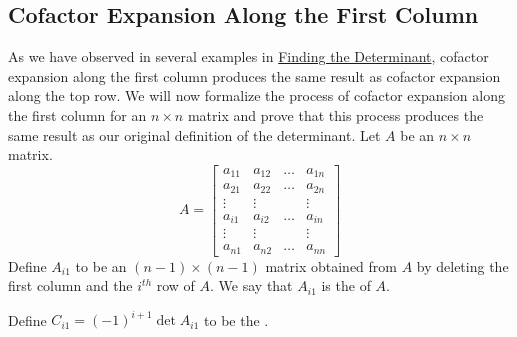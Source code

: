 \documentclass{ximera}
\begin{document}
\subsection*{Cofactor Expansion Along the First Column}
As we have observed in several examples in \href{https://ximera.osu.edu/linearalgebradzv3/LinearAlgebraInteractiveIntro/DET-0010/main}{Finding the Determinant}, cofactor expansion along the first column produces the same result as cofactor expansion along the top row.  We will now formalize the process of cofactor expansion along the first column for an $n\times n$ matrix and prove that this process produces the same result as our original definition of the determinant.
Let $A$ be an $n\times n$ matrix. 
$$A=\begin{bmatrix}a_{11} & a_{12} & \dots  & a_{1n}  \\
    a_{21} & a_{22} &\dots  & a_{2n}  \\
   \vdots & \vdots &  & \vdots \\
   a_{i1} & a_{i2} & \dots  & a_{in}\\
   \vdots & \vdots &  & \vdots  \\
   a_{n1} & a_{n2} & \dots  & a_{nn}\end{bmatrix}$$
   Define $A_{i1}$ to be an $(n-1)\times (n-1)$ matrix obtained from $A$ by deleting the first column and the $i^{th}$ row of $A$.  We say that $A_{i1}$ is the  of $A$.
\begin{center}
 \end{center} 
Define $C_{i1}=(-1)^{i+1}\det{A_{i1}}$ to be the
 .
\end{document}
